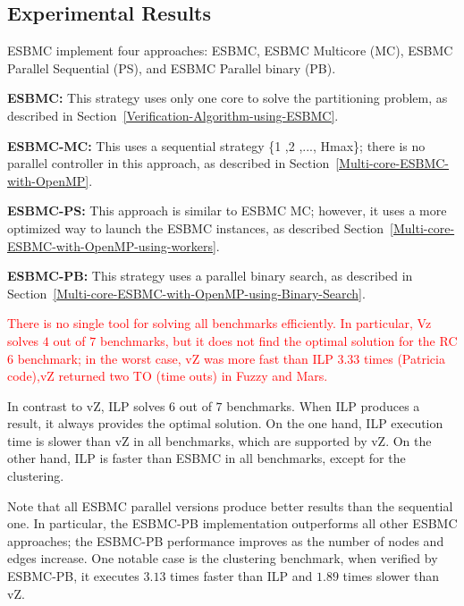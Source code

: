 \subsection{Experimental Results}
\label{Experimental-Results}

ESBMC implement four approaches: ESBMC, ESBMC Multicore (MC), ESBMC Parallel Sequential (PS), and ESBMC Parallel binary (PB).

\begin{itemize}
\item{\textbf{ESBMC:} This strategy uses only one core to solve the partitioning problem, as described in Section~\ref{Verification-Algorithm-using-ESBMC}.
\item{\textbf{ESBMC-MC:} This uses a sequential strategy \{1 ,2 ,\:...\:, Hmax\}; there is no parallel controller in this approach, as described in Section~\ref{Multi-core-ESBMC-with-OpenMP}.}
\item{\textbf{ESBMC-PS:} This approach is similar to ESBMC MC; however, it uses a more optimized way to launch the ESBMC instances, as described Section~\ref{Multi-core-ESBMC-with-OpenMP-using-workers}.}
\item{\textbf{ESBMC-PB:} This strategy uses a parallel binary search, as described in Section~\ref{Multi-core-ESBMC-with-OpenMP-using-Binary-Search}.}}
\end{itemize}

\textcolor{red}{There is no single tool for solving all benchmarks efficiently. In particular, Vz solves $4$ out of $7$ benchmarks, but it does not find the optimal solution for the RC$6$ benchmark; in the worst case, vZ was more fast than ILP 3.33 times (Patricia code),vZ returned two TO (time outs) in Fuzzy and Mars.}

In contrast to vZ, ILP solves $6$ out of $7$ benchmarks. When ILP produces a result, it always provides the optimal solution. On the one hand, ILP execution time is slower than vZ in all benchmarks, which are supported by vZ. On the other hand, ILP is faster than ESBMC in all benchmarks, except for the clustering.

Note that all ESBMC parallel versions produce better results than the sequential one. In particular, the ESBMC-PB implementation outperforms all other ESBMC approaches; the ESBMC-PB performance improves as the number of nodes and edges increase. One notable case is the clustering benchmark, when verified by ESBMC-PB, it executes $3$.$13$ times faster than ILP and $1$.$89$ times slower than vZ.

